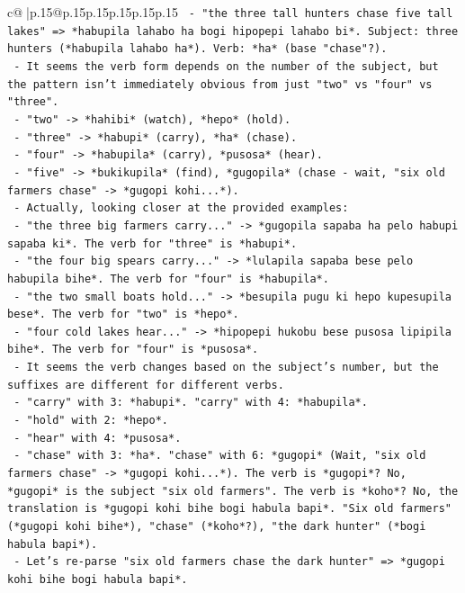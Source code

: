 \documentclass{article}
\begin{document}
{\begin{supertabular}{c@{$\;$}|p{.15\linewidth}@{}p{.15\linewidth}p{.15\linewidth}p{.15\linewidth}p{.15\linewidth}p{.15\linewidth}}
{{{\texttt{     {-} "the three tall hunters chase five tall lakes" => *habupila lahabo ha bogi hipopepi lahabo bi*. Subject: three hunters (*habupila lahabo ha*). Verb: *ha* (base "chase"?).} \\
\texttt{   {-} It seems the verb form depends on the number of the subject, but the pattern isn't immediately obvious from just "two" vs "four" vs "three".} \\
\texttt{     {-} "two" {-}> *hahibi* (watch), *hepo* (hold).} \\
\texttt{     {-} "three" {-}> *habupi* (carry), *ha* (chase).} \\
\texttt{     {-} "four" {-}> *habupila* (carry), *pusosa* (hear).} \\
\texttt{     {-} "five" {-}> *bukikupila* (find), *gugopila* (chase {-} wait, "six old farmers chase" {-}> *gugopi kohi...*).} \\
\texttt{   {-} Actually, looking closer at the provided examples:} \\
\texttt{     {-} "the three big farmers carry..." {-}> *gugopila sapaba ha pelo habupi sapaba ki*. The verb for "three" is *habupi*.} \\
\texttt{     {-} "the four big spears carry..." {-}> *lulapila sapaba bese pelo habupila bihe*. The verb for "four" is *habupila*.} \\
\texttt{     {-} "the two small boats hold..." {-}> *besupila pugu ki hepo kupesupila bese*. The verb for "two" is *hepo*.} \\
\texttt{     {-} "four cold lakes hear..." {-}> *hipopepi hukobu bese pusosa lipipila bihe*. The verb for "four" is *pusosa*.} \\
\texttt{   {-} It seems the verb changes based on the subject's number, but the suffixes are different for different verbs.} \\
\texttt{     {-} "carry" with 3: *habupi*. "carry" with 4: *habupila*.} \\
\texttt{     {-} "hold" with 2: *hepo*.} \\
\texttt{     {-} "hear" with 4: *pusosa*.} \\
\texttt{     {-} "chase" with 3: *ha*. "chase" with 6: *gugopi* (Wait, "six old farmers chase" {-}> *gugopi kohi...*). The verb is *gugopi*? No, *gugopi* is the subject "six old farmers". The verb is *koho*? No, the translation is *gugopi kohi bihe bogi habula bapi*. "Six old farmers" (*gugopi kohi bihe*), "chase" (*koho*?), "the dark hunter" (*bogi habula bapi*).} \\
\texttt{     {-} Let's re{-}parse "six old farmers chase the dark hunter" => *gugopi kohi bihe bogi habula bapi*.} \\
}}}
\end{supertabular}}
\end{document}
